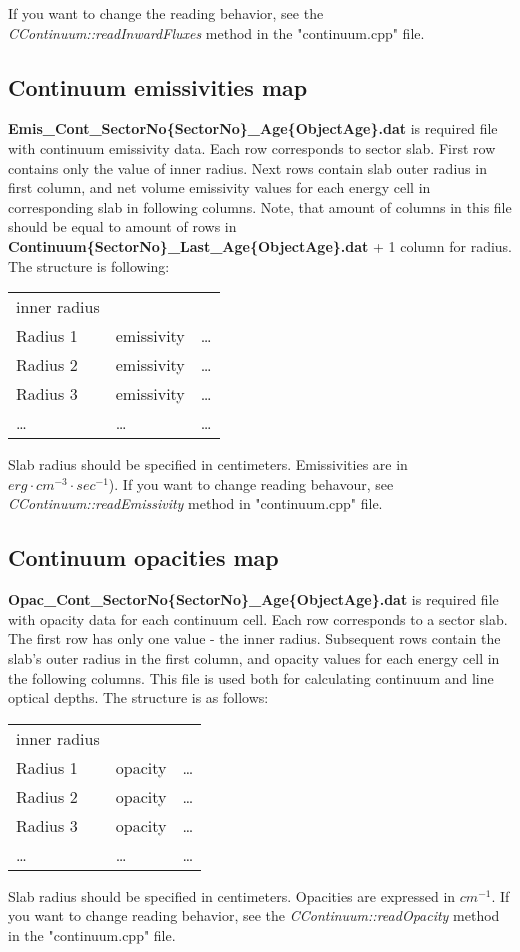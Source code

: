 \documentclass[a4paper]{article}
\begin{document}
If you want to change the reading behavior, see the {\it CContinuum::readInwardFluxes} method in the "continuum.cpp" file.

\subsection{Continuum emissivities map}
{\bf Emis\_Cont\_SectorNo\{SectorNo\}\_Age\{ObjectAge\}.dat} is required file with continuum emissivity data. Each row
corresponds to sector slab. First row contains only the value of inner radius.
Next rows contain slab outer radius in first column,
and net volume emissivity values for each energy cell in corresponding slab in following columns.
Note, that amount of columns in this file should
be equal to amount of rows in \\
{\bf Continuum\{SectorNo\}\_Last\_Age\{ObjectAge\}.dat} + 1 column for radius.
The structure is following:
\begin{table}[H]
    \begin{tabular}{lll}
        inner radius & & \\
        Radius 1 & emissivity & \ldots \\
        Radius 2 & emissivity & \ldots \\
        Radius 3 & emissivity & \ldots \\
        \ldots & \ldots & \ldots \\
    \end{tabular}
\end{table}
Slab radius should be specified in centimeters. Emissivities are in $erg \cdot cm^{-3} \cdot sec^{-1}$).
If you want to change reading behavour, see {\it CContinuum::readEmissivity} method in "continuum.cpp" file.

\subsection{Continuum opacities map}
{\bf Opac\_Cont\_SectorNo\{SectorNo\}\_Age\{ObjectAge\}.dat} is required file with opacity data for each continuum cell.
Each row corresponds to a sector slab. The first row has only one value - the inner radius.
Subsequent rows contain the slab's outer radius in the first column, and opacity values for each energy cell in the following columns.
This file is used both for calculating continuum and line optical depths. The structure is as follows:
\begin{table}[H]
    \begin{tabular}{lll}
        inner radius & & \\
        Radius 1 & opacity & \ldots \\
        Radius 2 & opacity & \ldots \\
        Radius 3 & opacity & \ldots \\
        \ldots & \ldots & \ldots \\
    \end{tabular}
\end{table}
Slab radius should be specified in centimeters. Opacities are expressed in $cm^{-1}$.
If you want to change reading behavior, see the {\it CContinuum::readOpacity} method in the "continuum.cpp" file.
\end{document}
